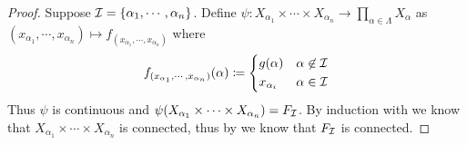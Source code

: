 \documentclass{techreport}
\begin{document}
\begin{proof}
	Suppose $\mathcal{I} = \{ \alpha_1,\cdots,\alpha_n\}$.
	Define $\psi : X_{\alpha_1} \times \cdots \times X_{\alpha_n} \to \prod_{\alpha \in \Lambda} X_\alpha$ as $(x_{\alpha_1},\cdots,x_{\alpha_n}) \mapsto f_{(x_{\alpha_1},\cdots,x_{\alpha_n})}$ where
	\[
	f_{(x_{\alpha_1},\cdots,x_{\alpha_n})}(\alpha) \coloneqq \begin{dcases}
 		g(\alpha) & \alpha \not\in \mathcal{I} \\
 		x_{\alpha_i} & \alpha \in \mathcal{I}
 	\end{dcases}
	\]
	Thus $\psi$ is continuous and $\psi(X_{\alpha_1} \times \cdots \times X_{\alpha_n}) = F_{\mathcal{I}}$.
	By induction with  we know that $X_{\alpha_1} \times \cdots \times X_{\alpha_n}$ is connected, thus by  we know that $F_{\mathcal{I}}$ is connected.
\end{proof}
\end{document}
